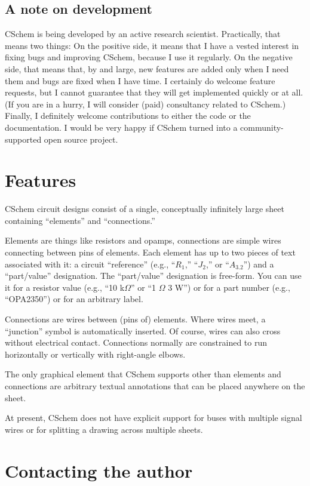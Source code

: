 \documentclass[11pt]{report}
\def\Ohm{$\Omega$}
\begin{document}
\subsection{A note on development}
CSchem is being developed by an active research
scientist. Practically, that means two things: On the positive side,
it means that I have a vested interest in fixing bugs and improving
CSchem, because I use it regularly. On the negative side, that means
that, by and large, new features are added only when I need them and
bugs are fixed when I have time. I certainly do welcome feature
requests, but I cannot guarantee that they will get implemented
quickly or at all. (If you are in a hurry, I will consider (paid)
consultancy related to CSchem.) Finally, I definitely welcome
contributions to either the code or the documentation. I would be very
happy if CSchem turned into a community-supported open source project.

\section{Features}

CSchem circuit designs consist of a single, conceptually infinitely
large sheet containing ``elements'' and ``connections.''

Elements are things like resistors and opamps, connections are simple
wires connecting between pins of elements. Each element has up to two
pieces of text associated with it: a circuit ``reference'' (e.g.,
``$R_1$,'' ``$J_2$,'' or ``$A_{3.2}$'') and a ``part/value''
designation. The ``part/value'' designation is free-form. You can use
it for a resistor value (e.g., ``10 k\Ohm'' or ``1 \Ohm{} 3 W'') or
for a part number (e.g., ``OPA2350'') or for an arbitrary
label.

Connections are wires between (pins of) elements. Where wires meet, a
``junction'' symbol is automatically inserted. Of course, wires can
also cross without electrical contact. Connections normally are
constrained to run horizontally or vertically with right-angle elbows.

The only graphical element that CSchem supports other than elements
and connections are arbitrary textual annotations that can be placed
anywhere on the sheet.

At present, CSchem does not have explicit support for buses with
multiple signal wires or for splitting a drawing across multiple
sheets.

\section{Contacting the author}
\end{document}
